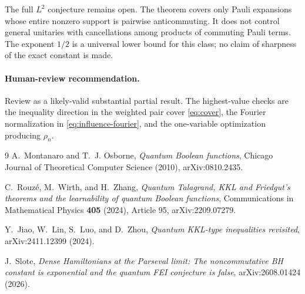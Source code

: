 \documentclass[11pt]{article}
\begin{document}
The full $L^2$ conjecture remains open. The theorem covers only Pauli
expansions whose entire nonzero support is pairwise anticommuting. It does not
control general unitaries with cancellations among products of commuting
Pauli terms. The exponent $1/2$ is a universal lower bound for this class; no
claim of sharpness of the exact constant is made.

\paragraph{Human-review recommendation.}
Review as a likely-valid substantial partial result. The highest-value checks
are the inequality direction in the weighted pair cover \eqref{eq:cover}, the
Fourier normalization in \eqref{eq:influence-fourier}, and the one-variable
optimization producing \(\rho_n\).

\begin{thebibliography}{9}
A.~Montanaro and T.~J. Osborne,
\emph{Quantum Boolean functions}, Chicago Journal of Theoretical Computer
Science (2010), arXiv:0810.2435.

C.~Rouz\'e, M.~Wirth, and H.~Zhang,
\emph{Quantum Talagrand, KKL and Friedgut's theorems and the learnability of
quantum Boolean functions}, Communications in Mathematical Physics
\textbf{405} (2024), Article 95, arXiv:2209.07279.

Y.~Jiao, W.~Lin, S.~Luo, and D.~Zhou,
\emph{Quantum KKL-type inequalities revisited}, arXiv:2411.12399 (2024).

J.~Slote,
\emph{Dense Hamiltonians at the Parseval limit: The noncommutative BH
constant is exponential and the quantum FEI conjecture is false},
arXiv:2608.01424 (2026).
\end{thebibliography}
\end{document}
